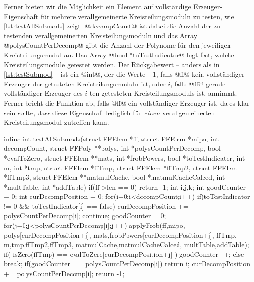 Ferner bieten wir die Möglichkeit ein Element auf vollständige
Erzeuger-Eigenschaft für mehrere verallgemeinerte Kreisteilungsmoduln zu
testen, wie \autoref{lst:testAllSubmods} zeigt. @decompCount@ ist dabei die
Anzahl der zu testenden verallgemeinerten Kreisteilungsmoduln und das Array
@polysCountPerDecomp@ gibt die Anzahl der Polynome für den jeweiligen
Kreisteilungsmodul an. Das Array @bool *toTestIndicator@ legt fest, welche
Kreisteilungsmodule getestet werden. Der Rückgabewert -- anders als in 
\autoref{lst:testSubmod} -- ist ein @int@, der die Werte $-1$, falls @ff@ kein
vollständiger Erzeuger der getesteten Kreisteilungsmoduln ist, oder $i$, falls
@ff@ gerade vollständiger Erzeuger des $i$-ten getesteten Kreisteilungsmoduls
ist, annimmt. Ferner bricht die Funktion ab, falls @ff@ ein vollständiger
Erzeuger ist, da es klar sein sollte, dass diese Eigenschaft lediglich für
\emph{einen} verallgemeinerten Kreisteilungsmodul zutreffen kann.

\begin{ccode}[caption={Aus \url{../Sage/enumeratePCNs.c}},
  firstnumber=861, label=lst:testAllSubmods]
inline int testAllSubmods(struct FFElem *ff, struct FFElem *mipo, 
        int decompCount, struct FFPoly **polys,
        int *polysCountPerDecomp, bool *evalToZero, 
        struct FFElem **mats, int *frobPowers, bool *toTestIndicator,
        int m, int *tmp, 
        struct FFElem *ffTmp, struct FFElem *ffTmp2, struct FFElem *ffTmp3,
        struct FFElem **matmulCache, bool *matmulCacheCalced,
        int *multTable, int *addTable){
    if(ff->len == 0) return -1;
    int i,j,k;
    int goodCounter = 0;
    int curDecompPosition = 0;
    for(i=0;i<decompCount;i++){
        if(toTestIndicator != 0 && toTestIndicator[i] == false){
            curDecompPosition += polysCountPerDecomp[i];
            continue;
        }
        goodCounter = 0;
        for(j=0;j<polysCountPerDecomp[i];j++){
            applyFrob(ff,mipo,
                    polys[curDecompPosition+j],
                    mats,frobPowers[curDecompPosition+j], ffTmp,
                    m,tmp,ffTmp2,ffTmp3,
                    matmulCache,matmulCacheCalced,
                    multTable,addTable);
            if( isZero(ffTmp) == evalToZero[curDecompPosition+j] ){
                goodCounter++;
            }else break;
        }
        if(goodCounter == polysCountPerDecomp[i]){
            return i;
        }
        curDecompPosition += polysCountPerDecomp[i];
    }
    return -1;
}
\end{ccode}


